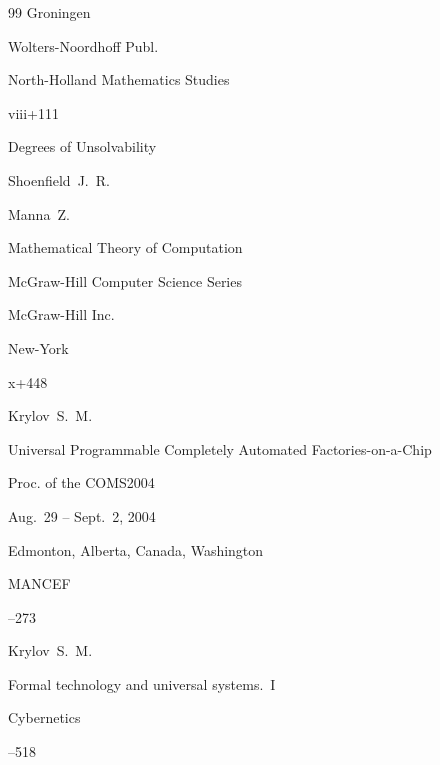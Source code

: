\begin{thebibliography}{99}
\publaddr Groningen

\publ Wolters-Noordhoff Publ.







\serial North-Holland Mathematics Studies


\totalpages viii+111 


\book Degrees of Unsolvability

\by Shoenfield~J.~R. 




\by Manna~Z.

\book Mathematical Theory of Computation

\serial McGraw-Hill Computer Science Series

\publ  McGraw-Hill Inc.

\publaddr New-York


\totalpages x+448




\by Krylov~S.~M.

\paper Universal Programmable Completely Automated Factories-on-a-Chip

\inbook Proc. of the COMS2004

\procinfo Aug.~29 -- Sept.~2, 2004


\publaddr Edmonton, Alberta, Canada, Washington

\publ MANCEF


--273




\by Krylov~S.~M.

\paper Formal technology and universal systems.~I

\jour Cybernetics 




--518


\end{thebibliography}

